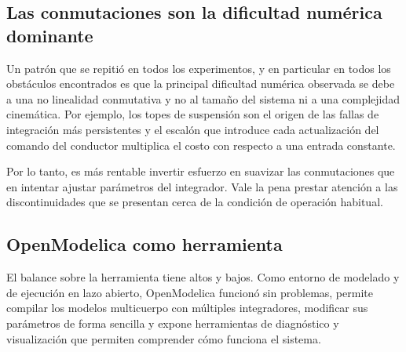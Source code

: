 \subsection*{Las conmutaciones son la dificultad numérica dominante}

Un patrón que se repitió en todos los experimentos, y en particular en todos los obstáculos encontrados es que la principal dificultad numérica observada se debe a una no linealidad conmutativa y no al tamaño del sistema ni a una complejidad cinemática. Por ejemplo, los topes de suspensión son el origen de las fallas de integración más persistentes y el escalón que introduce cada actualización del comando del conductor multiplica el costo con respecto a una entrada constante.

Por lo tanto, es más rentable invertir esfuerzo en suavizar las conmutaciones que en intentar ajustar parámetros del integrador. Vale la pena prestar atención a las discontinuidades que se presentan cerca de la condición de operación habitual.


\subsection*{OpenModelica como herramienta}

El balance sobre la herramienta tiene altos y bajos. Como entorno de modelado y de ejecución en lazo abierto, OpenModelica funcionó sin problemas, permite compilar los modelos multicuerpo con múltiples integradores, modificar sus parámetros de forma sencilla y expone herramientas de diagnóstico y visualización que permiten comprender cómo funciona el sistema.


